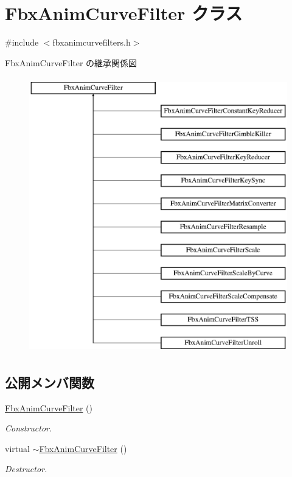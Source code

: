 \hypertarget{class_fbx_anim_curve_filter}{}\section{Fbx\+Anim\+Curve\+Filter クラス}
\label{class_fbx_anim_curve_filter}


{\ttfamily \#include $<$fbxanimcurvefilters.\+h$>$}

Fbx\+Anim\+Curve\+Filter の継承関係図\begin{figure}[H]
\begin{center}
\leavevmode
\includegraphics[height=12.000000cm]{class_fbx_anim_curve_filter}
\end{center}
\end{figure}
\subsection*{公開メンバ関数}
\begin{DoxyCompactItemize}
\item 
\hyperlink{class_fbx_anim_curve_filter_ac908ea01d9d49a263be450e760dabcce}{Fbx\+Anim\+Curve\+Filter} ()
\begin{DoxyCompactList}\small\item\em Constructor. \end{DoxyCompactList}\item 
virtual \hyperlink{class_fbx_anim_curve_filter_adafe5c10e506cabca6410869f53602bc}{$\sim$\+Fbx\+Anim\+Curve\+Filter} ()
\begin{DoxyCompactList}\small\item\em Destructor. \end{DoxyCompactList}\end{DoxyCompactItemize}
